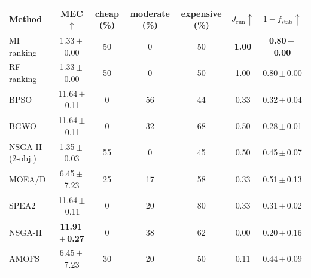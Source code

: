 \begin{tabular}{lcccccc}
\toprule
Method & MEC$\uparrow$ & cheap (\%) & moderate (\%) & expensive (\%) & $J_{\mathrm{run}}\uparrow$ & $1-f_{\mathrm{stab}}\uparrow$ \\
\midrule
MI ranking & 1.33\,$\pm$\,0.00 & 50 & 0 & 50 & \textbf{1.00} & \textbf{0.80\,$\pm$\,0.00} \\
RF ranking & 1.33\,$\pm$\,0.00 & 50 & 0 & 50 & 1.00 & 0.80\,$\pm$\,0.00 \\
BPSO & 11.64\,$\pm$\,0.11 & 0 & 56 & 44 & 0.33 & 0.32\,$\pm$\,0.04 \\
BGWO & 11.64\,$\pm$\,0.11 & 0 & 32 & 68 & 0.50 & 0.28\,$\pm$\,0.01 \\
NSGA-II (2-obj.) & 1.35\,$\pm$\,0.03 & 55 & 0 & 45 & 0.50 & 0.45\,$\pm$\,0.07 \\
MOEA/D & 6.45\,$\pm$\,7.23 & 25 & 17 & 58 & 0.33 & 0.51\,$\pm$\,0.13 \\
SPEA2 & 11.64\,$\pm$\,0.11 & 0 & 20 & 80 & 0.33 & 0.31\,$\pm$\,0.02 \\
NSGA-II & \textbf{11.91\,$\pm$\,0.27} & 0 & 38 & 62 & 0.00 & 0.20\,$\pm$\,0.16 \\
AMOFS & 6.45\,$\pm$\,7.23 & 30 & 20 & 50 & 0.11 & 0.44\,$\pm$\,0.09 \\
\bottomrule
\end{tabular}
